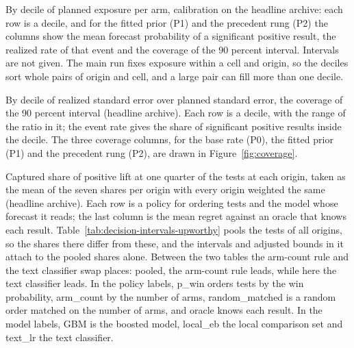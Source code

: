 \begin{table}[tp]\centering\scriptsize
\caption{By decile of planned exposure per arm, calibration on the headline archive: each row is a decile, and for the fitted prior (P1) and the precedent rung (P2) the columns show the mean forecast probability of a significant positive result, the realized rate of that event and the coverage of the 90 percent interval. Intervals are not given. The main run fixes exposure within a cell and origin, so the deciles sort whole pairs of origin and cell, and a large pair can fill more than one decile.}
\label{tab:calibration-upworthy}
\resizebox{\columnwidth}{!}{}
\end{table}

\begin{table}[tp]\centering\scriptsize
\caption{By decile of realized standard error over planned standard error, the coverage of the 90 percent interval (headline archive). Each row is a decile, with the range of the ratio in it; the event rate gives the share of significant positive results inside the decile. The three coverage columns, for the base rate (P0), the fitted prior (P1) and the precedent rung (P2), are drawn in Figure~\ref{fig:coverage}.}
\label{tab:coverage-ratio}
\resizebox{\columnwidth}{!}{}
\end{table}

\begin{table}[tp]\centering\small
\caption{Captured share of positive lift at one quarter of the tests at each origin, taken as the mean of the seven shares per origin with every origin weighted the same (headline archive). Each row is a policy for ordering tests and the model whose forecast it reads; the last column is the mean regret against an oracle that knows each result. Table~\ref{tab:decision-intervals-upworthy} pools the tests of all origins, so the shares there differ from these, and the intervals and adjusted bounds in it attach to the pooled shares alone. Between the two tables the arm-count rule and the text classifier swap places: pooled, the arm-count rule leads, while here the text classifier leads. In the policy labels, p\_win orders tests by the win probability, arm\_count by the number of arms, random\_matched is a random order matched on the number of arms, and oracle knows each result. In the model labels, GBM is the boosted model, local\_eb the local comparison set and text\_lr the text classifier.}
\label{tab:decision-upworthy}
\resizebox{\columnwidth}{!}{}
\end{table}

